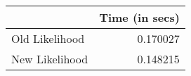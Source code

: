 \begin{tabular}{lr}
\toprule
{} &  Time (in secs) \\
\midrule
Old Likelihood &        0.170027 \\
New Likelihood &        0.148215 \\
\bottomrule
\end{tabular}
